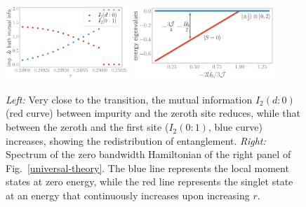 \documentclass{iopart}
\begin{document}
\begin{figure}[htpb]
	\includegraphics[width=0.41\textwidth]{mut-info-d0-01-across.pdf}
	\hspace*{\fill}
	\includegraphics[width=0.48\textwidth]{twosite_spectrum.pdf}
	\caption{{\it Left:} Very close to the transition, the mutual information \(I_2(d:0)\) (red curve) between impurity and the zeroth site reduces, while that between the zeroth and the first site (\(I_2(0:1)\), blue curve) increases, showing the redistribution of entanglement. {\it Right:} Spectrum of the zero bandwidth Hamiltonian of the right panel of Fig.~\eqref{universal-theory}. The blue line represents the local moment states at zero energy, while the red line represents the singlet state at an energy that continuously increases upon increasing \(r\).}
	\label{twosite-spectrum}
\end{figure}
\end{document}
